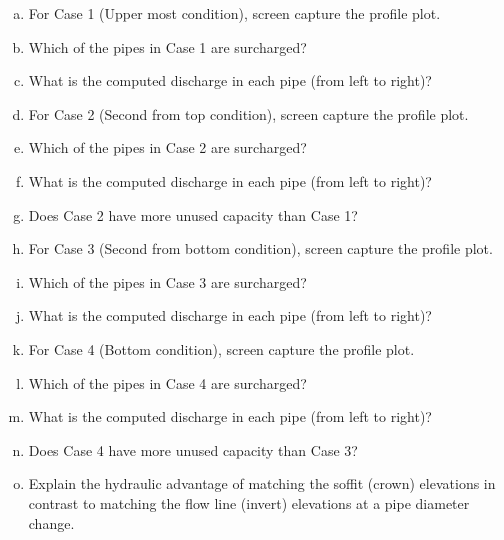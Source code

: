 \documentclass[12pt]{article}
\begin{document}
\begin{enumerate}
\begin{enumerate}[a)]
\item For Case 1 (Upper most condition), screen capture the profile plot. 
\item Which of the pipes in Case 1 are surcharged? 
\item What is the computed discharge in each pipe (from left to right)? 
\item For Case 2 (Second from top condition), screen capture the profile plot. 
\item Which of the pipes in Case 2 are surcharged? 
\item What is the computed discharge in each pipe (from left to right)? 
\item Does Case 2 have more unused capacity than Case 1? 
\item For Case 3 (Second from bottom condition), screen capture the profile plot. 
\item Which of the pipes in Case 3 are surcharged? 
\item What is the computed discharge in each pipe (from left to right)?
\item For Case 4 (Bottom condition), screen capture the profile plot.
\item Which of the pipes in Case 4 are surcharged? 
\item What is the computed discharge in each pipe (from left to right)? 
\item Does Case 4 have more unused capacity than Case 3? 
\item Explain the hydraulic advantage of matching the soffit (crown) elevations in contrast to matching the flow line (invert) elevations at a pipe diameter change.
\end{enumerate}
\end{enumerate}

%
%
%
\end{document}
